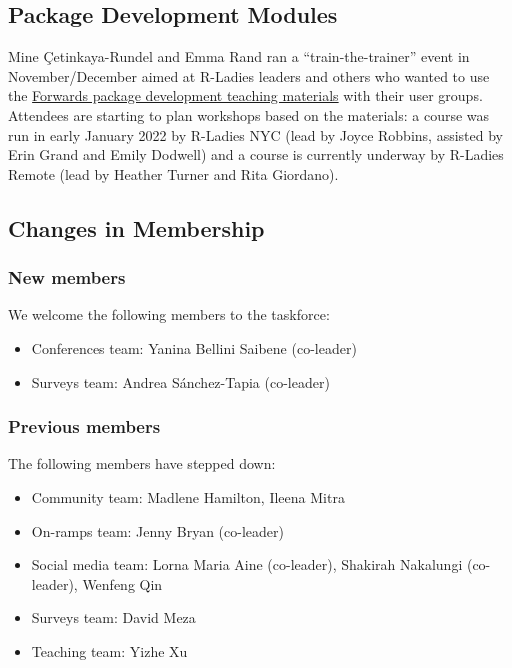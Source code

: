 \hypertarget{package-development-modules}{%
\subsection{Package Development
Modules}\label{package-development-modules}}

Mine Çetinkaya-Rundel and Emma Rand ran a ``train-the-trainer'' event in
November/December aimed at R-Ladies leaders and others who wanted to use
the
\href{https://github.com/forwards/workshops/tree/master/package-dev-modules}{Forwards
package development teaching materials} with their user groups.
Attendees are starting to plan workshops based on the materials: a
course was run in early January 2022 by R-Ladies NYC (lead by Joyce
Robbins, assisted by Erin Grand and Emily Dodwell) and a course is
currently underway by R-Ladies Remote (lead by Heather Turner and Rita
Giordano).

\hypertarget{changes-in-membership}{%
\subsection{Changes in Membership}\label{changes-in-membership}}

\hypertarget{new-members}{%
\subsubsection{New members}\label{new-members}}

We welcome the following members to the taskforce:

\begin{itemize}
\tightlist
\item
  Conferences team: Yanina Bellini Saibene (co-leader)
\item
  Surveys team: Andrea Sánchez-Tapia (co-leader)
\end{itemize}

\hypertarget{previous-members}{%
\subsubsection{Previous members}\label{previous-members}}

The following members have stepped down:

\begin{itemize}
\tightlist
\item
  Community team: Madlene Hamilton, Ileena Mitra
\item
  On-ramps team: Jenny Bryan (co-leader)
\item
  Social media team: Lorna Maria Aine (co-leader), Shakirah Nakalungi
  (co-leader), Wenfeng Qin
\item
  Surveys team: David Meza
\item
  Teaching team: Yizhe Xu
\end{itemize}


